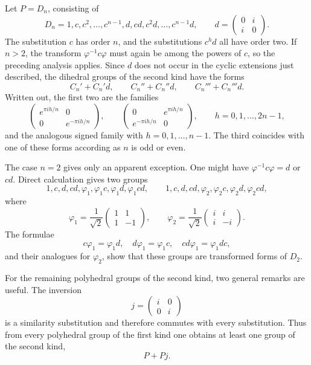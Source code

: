 \documentclass[11pt,a4paper]{article}
\begin{document}
Let \(P=D_n\), consisting of
\begin{equation}\label{eq:62-8d}
 D_n=1,c,c^2,\ldots,c^{n-1},d,cd,c^2d,\ldots,c^{n-1}d,
 \qquad
 d=\begin{pmatrix}0&i\\i&0\end{pmatrix}.
\end{equation}
The substitution \(c\) has order \(n\), and the substitutions \(c^hd\) all have order two.  If \(n>2\), the transform \(\varphi^{-1}c\varphi\) must again be among the powers of \(c\), so the preceding analysis applies.  Since \(d\) does not occur in the cyclic extensions just described, the dihedral groups of the second kind have the forms
\begin{equation}\label{eq:62-9}
 C_n'+C_n'd,
 \qquad
 C_n''+C_n''d,
 \qquad
 C_n'''+C_n'''d.
\end{equation}
Written out, the first two are the families
\[
 \begin{pmatrix}e^{\pi ih/n}&0\\0&e^{-\pi ih/n}\end{pmatrix},
 \qquad
 \begin{pmatrix}0&e^{\pi ih/n}\\e^{-\pi ih/n}&0\end{pmatrix},
 \qquad h=0,1,\ldots,2n-1,
\]
and the analogous signed family with \(h=0,1,\ldots,n-1\).  The third coincides with one of these forms according as \(n\) is odd or even.

The case \(n=2\) gives only an apparent exception.  One might have \(\varphi^{-1}c\varphi=d\) or \(cd\).  Direct calculation gives two groups
\begin{equation}\label{eq:62-11}
 1,c,d,cd,\varphi_1,\varphi_1c,\varphi_1d,\varphi_1cd,
 \qquad
 1,c,d,cd,\varphi_2,\varphi_2c,\varphi_2d,\varphi_2cd,
\end{equation}
where
\[
 \varphi_1=\frac1{\sqrt2}\begin{pmatrix}1&1\\1&-1\end{pmatrix},
 \qquad
 \varphi_2=\frac1{\sqrt2}\begin{pmatrix}i&i\\i&-i\end{pmatrix}.
\]
The formulae
\[
 c\varphi_1=\varphi_1d,
 \quad d\varphi_1=\varphi_1c,
 \quad cd\varphi_1=\varphi_1dc,
\]
and their analogues for \(\varphi_2\), show that these groups are transformed forms of \(D_2\).

For the remaining polyhedral groups of the second kind, two general remarks are useful.  The inversion
\begin{equation}\label{eq:62-inversion}
 j=\begin{pmatrix}i&0\\0&i\end{pmatrix}
\end{equation}
is a similarity substitution and therefore commutes with every substitution.  Thus from every polyhedral group of the first kind one obtains at least one group of the second kind,
\begin{equation}\label{eq:62-12}
 P+Pj.
\end{equation}
\end{document}
